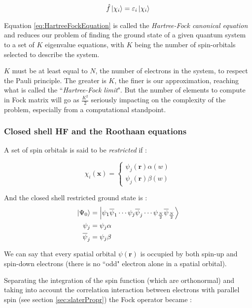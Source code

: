 \documentclass[a4paper,12pt]{article}
\begin{document}
\begin{align}
	\hat{f} \ket{\chi_i} = \varepsilon_{i} \ket{\chi_{i}} \label{eq:HartreeFockEquation}
\end{align}

Equation \eqref{eq:HartreeFockEquation} is called the \textit{Hartree-Fock canonical equation} and reduces our problem of finding the ground state of a given quantum system to a set of $K$ eigenvalue equations, with $K$ being the number of spin-orbitals selected to describe the system. 

$K$ must be at least equal to $N$, the number of electrons in the system, to respect the Pauli principle. The greater is $K$, the finer is our approximation, reaching what is called the ``\textit{Hartree-Fock limit}". But the number of elements to compute in Fock matrix will go as $\frac{K^2}{2}$ seriously impacting on the complexity of the problem, especially from a computational standpoint.

\subsubsection{Closed shell HF and the Roothaan equations}

A set of spin orbitals is said to be \textit{restricted} if :


\[\chi_{i}(\mathbf{x}) = \left\{
  \begin{array}{lr}
    \psi_{j}(\mathbf{r}) \alpha(w)\\
    \psi_{j}(\mathbf{r}) \beta(w)
  \end{array}
\right.
\]

And the closed shell restricted ground state is :
\begin{align}
	\ket{\Psi_{0}} & = \ket{ \psi_{1} \overline{\psi}_{1} \cdots  
	\psi_{j} \overline{\psi}_{j}
	\cdots	
	\psi_{\frac{N}{2}} \overline{\psi}_{\frac{N}{2}}}
	\\
	\psi_{j} & = \psi_{j} \alpha
	\\
	\overline{\psi}_{j} & = \psi_{j} \beta
\end{align}

We can say that every spatial orbital $\psi(\mathbf{r})$ is occupied by both spin-up and spin-down electrons (there is no ``odd" electron alone in a spatial orbital).

Separating the integration of the spin function (which are orthonormal) and taking into account the correlation interaction between electrons with parallel spin (see section \ref{sec:slaterPropr}) \cite[p.132-133]{Attila} the Fock operator became :
\end{document}
